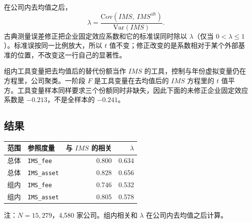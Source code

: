 \documentclass[11pt]{article}
\begin{document}
在公司内去均值之后，
\begin{equation}
\lambda=\frac{\mathrm{Cov}(IMS,\ IMS^{\mathrm{alt}})}{\mathrm{Var}(IMS)}.
\label{eq:lambda}
\end{equation}
古典测量误差修正把企业固定效应系数和它的标准误同时除以 \(\lambda\)（仅当 \(0<\lambda\le 1\)）。标准误按同一比例放大，所以 \(t\) 值不变；修正改变的是系数相对于某个外部基准的位置，不改变这一行自己的显著性。

组内工具变量把去均值后的替代份额当作 \(IMS\) 的工具，控制与年份虚拟变量仍在方程里，公司聚类。一阶段 \(F\) 是工具变量在去均值后的 \(IMS\) 方程里的 \(t\) 值平方。工具变量样本同样要求三个份额同时非缺失，因此下面的未修正企业固定效应系数是 \(-0.213\)，不是全样本的 \(-0.241\)。

\subsection{结果}

\begin{center}
\begin{threeparttable}
\caption{信度比}
\label{tab:lambda}
\begin{tabular}{llrr}
\toprule
范围 & 参照度量 & 与 \(IMS\) 的相关 & \(\lambda\) \\
\midrule
总体 & \texttt{IMS\_fee} & 0.800 & 0.634 \\
总体 & \texttt{IMS\_asset} & 0.828 & 0.656 \\
组内 & \texttt{IMS\_fee} & 0.746 & 0.532 \\
组内 & \texttt{IMS\_asset} & 0.805 & 0.578 \\
\bottomrule
\end{tabular}
\begin{tablenotes}\footnotesize
\item 注：\(N=15{,}279\)，4,580 家公司。组内相关和 \(\lambda\) 在公司内去均值之后计算。
\end{tablenotes}
\end{threeparttable}
\end{center}
\end{document}
